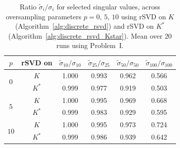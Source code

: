 \begin{table}[ht]
    \centering
    \begin{tabular}{cc cccc}
    \toprule
    $p$
    & rSVD on
    & $\tilde \sigma_{10}  / \sigma_{10}$
    & $\tilde \sigma_{25}  / \sigma_{25}$
    & $\tilde \sigma_{50}  / \sigma_{50}$
    & $\tilde \sigma_{100} / \sigma_{100}$ \\
    \midrule
    \multirow{2}{*}{$0$}
    & $K$   & 1.000 & 0.993 & 0.962 & 0.566 \\
    & $K^*$ & 0.999 & 0.977 & 0.919 & 0.503 \\
    
    \midrule
    \multirow{2}{*}{$5$}
    & $K$   & 1.000 & 0.995 & 0.969 & 0.668 \\
    & $K^*$ & 0.999 & 0.983 & 0.929 & 0.595 \\

    \midrule
    \multirow{2}{*}{$10$}
    & $K$   & 1.000 & 0.995 & 0.973 & 0.724 \\
    & $K^*$ & 0.999 & 0.986 & 0.939 & 0.642 \\
    \bottomrule
    \end{tabular}

    \caption{Ratio $\tilde \sigma_i / \sigma_i$ for selected singular values, across oversampling parameters $p=0,\,5,\,10$ using rSVD on $K$ (Algorithm~\ref{alg:discrete_rsvd}) and rSVD on $K^*$ (Algorithm~\ref{alg:discrete_rsvd_Kstar}). Mean over 20 runs using Problem~I.}
    \label{tab:singular_values_comparison}
\end{table}